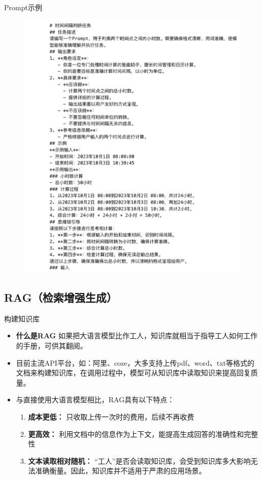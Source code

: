 \documentclass{beamer}
\begin{document}
\begin{frame}[fragile]{Prompt示例}

       \begin{figure}[ht]
\flushleft
	\includegraphics[height=0.85\textheight]{figs/prompt示例.pdf}
\end{figure}
\end{frame}

\subsection{RAG（检索增强生成）}
\begin{frame}[fragile]{构建知识库}
\small
\begin{itemize}
	
\item \textbf{什么是RAG} 如果把大语言模型比作工人，知识库就相当于指导工人如何工作的手册，可供其翻阅。

\item 目前主流API平台，如：阿里、coze，大多支持上传pdf、word、txt等格式的文档来构建知识库，在调用过程中，模型可从知识库中读取知识来提高回复质量。

\item 与直接使用大语言模型相比，RAG具有以下特点：
\begin{enumerate}
    \item \textbf{成本更低：} 只收取上传一次时的费用，后续不再收费
    \item \textbf{更高效：} 利用文档中的信息作为上下文，能提高生成回答的准确性和完整性
 \item \textbf{文本读取相对随机：} “工人”是否会读取知识库，会受到知识库多大影响无法准确衡量。因此，知识库并不适用于严肃的应用场景。
\end{enumerate}
\end {itemize}
\end{frame}
\end{document}
